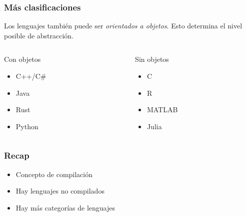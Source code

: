 \documentclass[14pt,aspectratio=169,xcolor=dvipsnames]{beamer}
\begin{document}
\begin{frame}\frametitle{Más clasificaciones}
Los lenguajes también puede ser \emph{orientados a objetos}. Esto determina el nivel posible de abstracción.
    \begin{columns}
        \begin{column}{0.45\textwidth}
            Con objetos
            \begin{itemize}
                \item C++/C\#
                \item Java
                \item Rust
                \item Python
            \end{itemize}
        \end{column}

        \begin{column}{0.45\textwidth}
            Sin objetos
            \begin{itemize}
                \item C
                \item R
                \item MATLAB
                \item Julia
            \end{itemize}
        \end{column}
    \end{columns}
\end{frame}
\begin{frame}\frametitle{Recap}
    \begin{itemize}
        \item Concepto de compilación
        \item Hay lenguajes no compilados
        \item Hay más categorías de lenguajes
    \end{itemize}
\end{frame}
\begin{frame}
    \maketitle
\end{frame}
\end{document}

